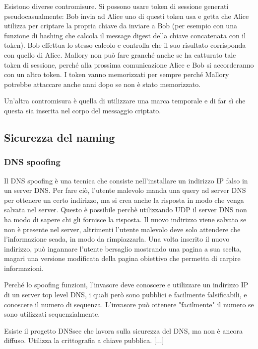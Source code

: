 Esistono diverse contromisure.
Si possono usare token di sessione generati pseudocasualmente:
Bob invia ad Alice uno di questi token usa e getta che Alice utilizza per criptare la propria chiave da inviare a Bob (per esempio con una funzione di hashing che calcola il message digest della chiave concatenata con il token).
Bob effettua lo stesso calcolo e controlla che il suo risultato corrisponda con quello di Alice.
Mallory non può fare granché anche se ha catturato tale token di sessione, perché alla prossima comunicazione Alice e Bob si accorderanno con un altro token.
I token vanno memorizzati per sempre perché Mallory potrebbe attaccare anche anni dopo se non è stato memorizzato.

Un'altra contromisura è quella di utilizzare una marca temporale e di far sì che questa sia inserita nel corpo del messaggio criptato.

\subsection{Sicurezza del naming} %

\subsubsection{DNS spoofing}
Il DNS spoofing è una tecnica che consiste nell'installare un indirizzo IP falso in un server DNS.
Per fare ciò, l'utente malevolo manda una query ad server DNS per ottenere un certo indirizzo, ma si crea anche la risposta in modo che venga salvata nel server.
Questo è possibile perchè utilizzando UDP il server DNS non ha modo di sapere chi gli fornisce la risposta.
Il nuovo indirizzo viene salvato se non è presente nel server, altrimenti l'utente malevolo deve solo attendere che l'informazione scada, in modo da rimpiazzarla.
Una volta inserito il nuovo indirizzo, può ingannare l'utente bersaglio mostrando una pagina a sua scelta, magari una versione modificata della pagina obiettivo che permetta di carpire informazioni.

Perché lo spoofing funzioni, l'invasore deve conoscere e utilizzare un indirizzo IP di un server top level DNS, i quali però sono pubblici e facilmente falsificabili, e conoscere il numero di sequenza.
L'invasore può ottenere "facilmente" il numero se sono utilizzati sequenzialmente.

Esiste il progetto DNSsec che lavora sulla sicurezza del DNS, ma non è ancora diffuso.
Utilizza la crittografia a chiave pubblica. [...]
